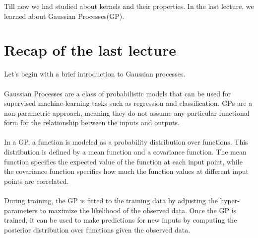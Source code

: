 \documentclass[12pt]{article}
\begin{document}
    




Till now we had studied about kernels and their properties. In the last lecture, we learned about Gaussian Processes(GP).

\section{Recap of the last lecture}
Let's begin with a brief introduction to Gaussian processes.\\
\\
Gaussian Processes are a class of probabilistic models that can be used for supervised machine-learning tasks such as regression and classification. GPs are a non-parametric approach, meaning they do not assume any particular functional form for the relationship between the inputs and outputs.\\
\\
In a GP, a function is modeled as a probability distribution over functions. This distribution is defined by a mean function and a covariance function. The mean function specifies the expected value of the function at each input point, while the covariance function specifies how much the function values at different input points are correlated.\\
\\
During training, the GP is fitted to the training data by adjusting the hyper-parameters to maximize the likelihood of the observed data. Once the GP is trained, it can be used to make predictions for new inputs by computing the posterior distribution over functions given the observed data.\\
\end{document}
